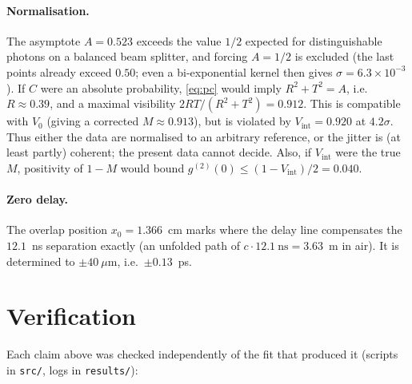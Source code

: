 \documentclass{article}
\newcommand{\Vi}{V_{\mathrm{int}}}
\begin{document}
\paragraph{Normalisation.} The asymptote $A=0.523$ exceeds the value $1/2$
expected for distinguishable photons on a balanced beam splitter, and
forcing $A=1/2$ is excluded (the last points already exceed $0.50$; even a
bi-exponential kernel then gives $\sigma=6.3\times10^{-3}$). If $C$ were an
absolute probability, \cref{eq:pc} would imply $R^2+T^2=A$, i.e.\
$R\approx0.39$, and a maximal visibility $2RT/(R^2+T^2)=0.912$. This is
compatible with $V_0$ (giving a corrected $M\approx0.913$), but is violated
by $\Vi=0.920$ at $4.2\sigma$. Thus either the data are normalised to an
arbitrary reference, or the jitter is (at least partly) coherent; the
present data cannot decide. Also, if $\Vi$ were the true $M$, positivity of
$1-M$ would bound $g^{(2)}(0)\le(1-\Vi)/2=0.040$.

\paragraph{Zero delay.} The overlap position $x_0=1.366$~cm marks where the
delay line compensates the $12.1$~ns separation exactly (an unfolded path of
$c\cdot12.1~\mathrm{ns}=3.63$~m in air). It is determined to $\pm40~\mu$m,
i.e.\ $\pm0.13$~ps.

\section{Verification}
\label{sec:verif}

Each claim above was checked independently of the fit that produced it
(scripts in \texttt{src/}, logs in \texttt{results/}):
\end{document}
